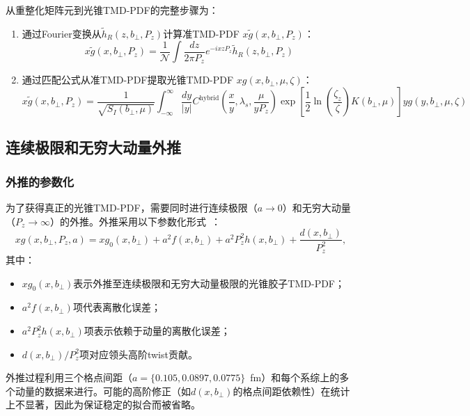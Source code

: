 \documentclass[12pt,a4paper]{ctexart}
\theoremstyle{definition}
\newcommand{\hR}{\tilde{h}_R}
\newcommand{\Pz}{P_z}
\newcommand{\bperp}{b_\perp}
\begin{document}
从重整化矩阵元到光锥TMD-PDF的完整步骤为：
\begin{enumerate}
    \item 通过Fourier变换从$\hR(z, \bperp, \Pz)$计算准TMD-PDF $x\tilde{g}(x, \bperp, \Pz)$：
    \begin{equation}
        x\tilde{g}(x, \bperp, \Pz) = \frac{1}{\mathcal{N}} \int \frac{dz}{2\pi\Pz} e^{-ixz\Pz} \hR(z, \bperp, \Pz)
    \end{equation}
    \item 通过匹配公式从准TMD-PDF提取光锥TMD-PDF $x g(x, \bperp, \mu, \zeta)$：
    \begin{equation}
        x\tilde{g}(x, \bperp, \Pz) = \frac{1}{\sqrt{S_I(\bperp, \mu)}} \int_{-\infty}^{\infty} \frac{dy}{|y|} C^{\text{hybrid}}\!\left(\frac{x}{y}, \lambda_s, \frac{\mu}{y\Pz}\right) \exp\!\left[\frac{1}{2}\ln\!\left(\frac{\zeta_z}{\zeta}\right)K(\bperp, \mu)\right] y g(y, \bperp, \mu, \zeta)
    \end{equation}
\end{enumerate}

\subsection{连续极限和无穷大动量外推}

\subsubsection{外推的参数化}

为了获得真正的光锥TMD-PDF，需要同时进行连续极限（$a \to 0$）和无穷大动量（$\Pz \to \infty$）的外推。外推采用以下参数化形式~\cite{Chen2025gluon}：
\begin{equation}\label{eq:cont_extrap}
    x g(x, \bperp, \Pz, a) = x g_0(x, \bperp) + a^2 f(x, \bperp) + a^2 \Pz^2 h(x, \bperp) + \frac{d(x, \bperp)}{\Pz^2},
\end{equation}
其中：
\begin{itemize}
    \item $x g_0(x, \bperp)$表示外推至连续极限和无穷大动量极限的光锥胶子TMD-PDF；
    \item $a^2 f(x, \bperp)$项代表离散化误差；
    \item $a^2 \Pz^2 h(x, \bperp)$项表示依赖于动量的离散化误差；
    \item $d(x, \bperp)/\Pz^2$项对应领头高阶twist贡献。
\end{itemize}

外推过程利用三个格点间距（$a = \{0.105, 0.0897, 0.0775\}$~fm）和每个系综上的多个动量的数据来进行。可能的高阶修正（如$d(x, \bperp)$的格点间距依赖性）在统计上不显著，因此为保证稳定的拟合而被省略。
\end{document}
